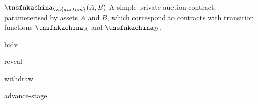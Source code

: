 \begin{transitionfn}{$\tnsfnkachina_{\vn{auction}}(A, B)$}
  A simple private auction contract, parameterised by assets $A$ and $B$, which
  correspond to contracts with transition functions $\tnsfnkachina_A$ and
  $\tnsfnkachina_B$.

  \vsep

  \begin{receiveinput}{bid}{v}
    \State {}
  \end{receiveinput}

  \begin{receiveinput}{reveal}{}
    \State {}
    \State {}
    \Else
      \State {}
      \State {}
    \EndIf
  \end{receiveinput}

  \begin{receiveinput}{withdraw}{}
    \State {}
    \State {}
      \State {}
    \Else
      \State {}
    \EndIf
  \end{receiveinput}

  \begin{receiveinput}{advance-stage}{}
    \State {}
    \State {}
  \end{receiveinput}
\end{transitionfn}
